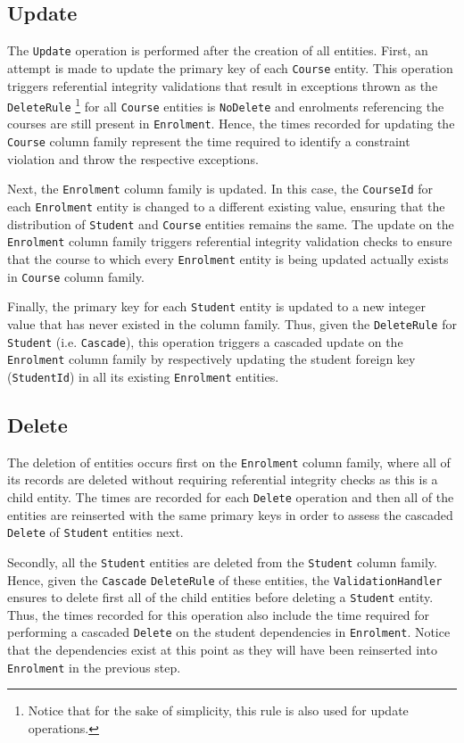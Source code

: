 \subsection{Update}
The \texttt{Update} operation is performed after the creation of all entities.
First,  an attempt is made to update the primary key of each \texttt{Course}
entity.  This operation triggers referential integrity  validations that result
in exceptions thrown as the \texttt{DeleteRule} \footnote{Notice that for the
sake of simplicity, this rule is also used for  update operations.} for all
\texttt{Course} entities is \texttt{NoDelete} and enrolments referencing the
courses are still present in \texttt{Enrolment}. Hence, the times recorded for
updating the \texttt{Course} column family represent the time required to
identify a constraint violation and throw the respective exceptions.
					
Next,  the \texttt{Enrolment} column family is updated.  In this case,  the
\texttt{CourseId} for each \texttt{Enrolment} entity is changed to a different
existing value,  ensuring that the distribution of \texttt{Student} and
\texttt{Course} entities remains the same. The update on the \texttt{Enrolment}
column family triggers referential integrity validation checks to ensure that
the course to which every \texttt{Enrolment} entity is being updated actually
exists in \texttt{Course} column family. 
					
Finally,  the primary key for each \texttt{Student} entity is updated to a new
integer value that has never existed in the column family. Thus, given
the \texttt{DeleteRule} for \texttt{Student} (i.e. \texttt{Cascade}),  this
operation triggers a cascaded update on the \texttt{Enrolment} column family   
 by respectively updating the student foreign key (\texttt{StudentId}) in all
 its existing \texttt{Enrolment} entities.
		
\subsection{Delete} 
The deletion of entities occurs first on the
\texttt{Enrolment} column family,  where all of its records are deleted without
requiring referential integrity checks as this is a child entity.  The times are
recorded for each \texttt{Delete} operation and then all of the entities are
reinserted with the same primary keys in order to assess the cascaded
\texttt{Delete} of \texttt{Student} entities next. 
				
Secondly,  all  the \texttt{Student} entities are deleted from the
\texttt{Student} column family. Hence, given the \texttt{Cascade}
\texttt{DeleteRule} of these entities,  the \texttt{ValidationHandler} ensures
to delete first all of the child entities before deleting a \texttt{Student} entity. 
Thus,  the times recorded for this operation also include the time required for
performing a cascaded \texttt{Delete} on the student dependencies in
\texttt{Enrolment}.
Notice that the dependencies exist at this point as they will have been reinserted into
\texttt{Enrolment} in the previous step. 
				
